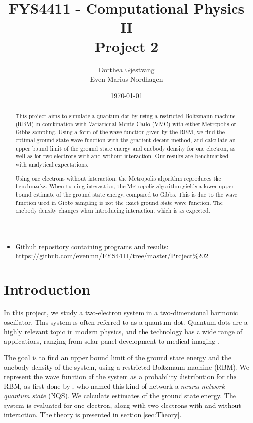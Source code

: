 \documentclass[norsk,a4paper,12pt]{article}
\title{FYS4411 - Computational Physics II\\\vspace{2mm} \Large{Project 2}}
\author{\large Dorthea Gjestvang\\ Even Marius Nordhagen}
\date\today
\begin{document}
\maketitle

\begin{itemize}
\item Github repository containing programs and results: \\\url{https://github.com/evenmn/FYS4411/tree/master/Project%202}
\end{itemize}

\begin{abstract}
This project aims to simulate a quantum dot by using a restricted Boltzmann machine (RBM) in combination with Variational Monte Carlo (VMC) with either Metropolis or Gibbs sampling. Using a form of the wave function given by the RBM, we find the optimal ground state wave function with the gradient decent method, and calculate an upper bound limit of the ground state energy and onebody density for one electron, as well as for two electrons with and without interaction. Our results are benchmarked with analytical expectations. 
\par 

Using one electrons without interaction, the Metropolis algorithm reproduces the benchmarks. When turning interaction, the Metropolis algorithm yields a lower upper bound estimate of the ground state energy, compared to Gibbs. This is due to the wave function used in Gibbs sampling is not the exact ground state wave function. The onebody density changes when introducing interaction, which is as expected.   
\end{abstract}


\newpage

\tableofcontents

\newpage

\section{Introduction} \label{sec:Introduction}
In this project, we study a two-electron system in a two-dimensional harmonic oscillator. This system is often referred to as a quantum dot. Quantum dots are a highly relevant topic in modern physics, and the technology has a wide range of applications, ranging from solar panel development to medical imaging \cite{Chilton}.
\par 
\vspace{3mm}

The goal is to find an upper bound limit of the ground state energy and the onebody density of the system, using a restricted Boltzmann machine (RBM). We represent the wave function of the system as a probability distribution for the RBM, as first done by \cite{Carleo}, who named this kind of network a \emph{neural network quantum state} (NQS). We calculate estimates of the ground state energy. The system is evaluated for one electron, along with two electrons with and without interaction. The theory is presented in section \ref{sec:Theory}.
\par 
\vspace{3mm}
\end{document}
